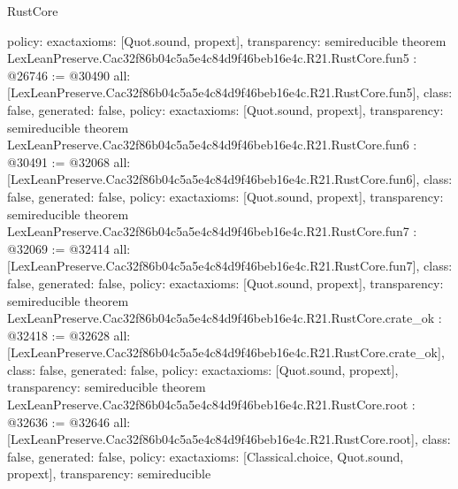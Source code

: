 \begin{lexlean}{RustCore}
\begin{coremodule}
{  policy: exact{axioms: [Quot.sound, propext]},
  transparency: semireducible
}
theorem LexLeanPreserve.Cac32f86b04c5a5e4c84d9f46beb16e4c.R21.RustCore.fun5 : @26746 := @30490 {
  all: [LexLeanPreserve.Cac32f86b04c5a5e4c84d9f46beb16e4c.R21.RustCore.fun5],
  class: false,
  generated: false,
  policy: exact{axioms: [Quot.sound, propext]},
  transparency: semireducible
}
theorem LexLeanPreserve.Cac32f86b04c5a5e4c84d9f46beb16e4c.R21.RustCore.fun6 : @30491 := @32068 {
  all: [LexLeanPreserve.Cac32f86b04c5a5e4c84d9f46beb16e4c.R21.RustCore.fun6],
  class: false,
  generated: false,
  policy: exact{axioms: [Quot.sound, propext]},
  transparency: semireducible
}
theorem LexLeanPreserve.Cac32f86b04c5a5e4c84d9f46beb16e4c.R21.RustCore.fun7 : @32069 := @32414 {
  all: [LexLeanPreserve.Cac32f86b04c5a5e4c84d9f46beb16e4c.R21.RustCore.fun7],
  class: false,
  generated: false,
  policy: exact{axioms: [Quot.sound, propext]},
  transparency: semireducible
}
theorem LexLeanPreserve.Cac32f86b04c5a5e4c84d9f46beb16e4c.R21.RustCore.crate_ok : @32418 := @32628 {
  all: [LexLeanPreserve.Cac32f86b04c5a5e4c84d9f46beb16e4c.R21.RustCore.crate_ok],
  class: false,
  generated: false,
  policy: exact{axioms: [Quot.sound, propext]},
  transparency: semireducible
}
theorem LexLeanPreserve.Cac32f86b04c5a5e4c84d9f46beb16e4c.R21.RustCore.root : @32636 := @32646 {
  all: [LexLeanPreserve.Cac32f86b04c5a5e4c84d9f46beb16e4c.R21.RustCore.root],
  class: false,
  generated: false,
  policy: exact{axioms: [Classical.choice, Quot.sound, propext]},
  transparency: semireducible
}


\end{coremodule}
\end{lexlean}
